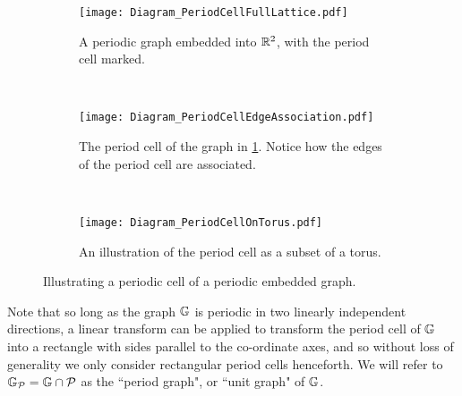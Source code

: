 \begin{figure}[b!]
	\centering
	\begin{subfigure}[t]{0.45\textwidth}
		\centering
		\texttt{[image: Diagram\_PeriodCellFullLattice.pdf]}
		\caption{\label{fig:Diagram_PeriodCellFullLattice} A periodic graph embedded into $\mathbb{R}^2$, with the period cell marked.}
	\end{subfigure}
	~
	\begin{subfigure}[t]{0.45\textwidth}
		\centering
		\texttt{[image: Diagram\_PeriodCellEdgeAssociation.pdf]}
		\caption{\label{fig:Diagram_PeriodCellEdgeAssociation} The period cell of the graph in \ref{fig:Diagram_PeriodCellFullLattice}. Notice how the edges of the period cell are associated.}
	\end{subfigure}
	\\
	\begin{subfigure}[b]{0.75\textwidth}
		\centering
		\texttt{[image: Diagram\_PeriodCellOnTorus.pdf]}
		\caption{\label{fig:Diagram_PeriodCellOnTorus} An illustration of the period cell as a subset of a torus.}
	\end{subfigure}
	\caption{\label{fig:PeriodCellIllustration} Illustrating a periodic cell of a periodic embedded graph.}
\end{figure} 
Note that so long as the graph $\mathbb{G}$ is periodic in two linearly independent directions, a linear transform can be applied to transform the period cell of $\mathbb{G}$ into a rectangle with sides parallel to the co-ordinate axes, and so without loss of generality we only consider rectangular period cells henceforth.
We will refer to $\mathbb{G}_{\mathcal{P}} = \mathbb{G} \cap \mathcal{P}$ as the ``period graph", or ``unit graph" of $\mathbb{G}$.

